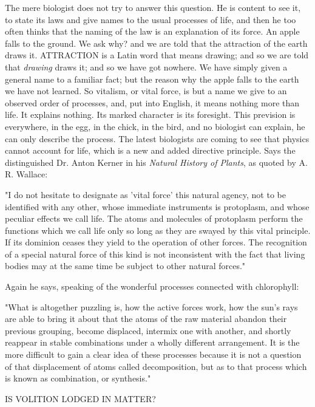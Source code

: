 The mere biologist does not try to answer this question. He is content to see it, to state its
laws and give names to the usual processes of life, and then he too often thinks that the
naming of the law is an explanation of its force. An apple falls to the ground. We ask why?
and we are told that the attraction of the earth draws it. ATTRACTION is a Latin word that
means drawing; and so we are told that \textit{drawing} draws it; and so we have got nowhere. We
have simply given a general name to a familiar fact; but the reason why the apple falls to the
earth we have not learned. So vitalism, or vital force, is but a name we give to an observed
order of processes, and, put into English, it means nothing more than life. It explains nothing.
Its marked character is its foresight. This prevision is everywhere, in the egg, in the chick, in
the bird, and no biologist can explain, he can only describe the process. The latest biologists
are coming to see that physics cannot account for life, which is a new and added directive
principle. Says the distinguished Dr. Anton Kerner in his \textit{Natural History of Plants}, as
quoted by A. R. Wallace:

"I do not hesitate to designate as 'vital force' this natural agency, not to be identified with any
other, whose immediate instruments is protoplasm, and whose peculiar effects we call life.
The atoms and molecules of protoplasm perform the functions which we call life only so
long as they are swayed by this vital principle. If its dominion ceases they yield to the
operation of other forces. The recognition of a special natural force of this kind is not
inconsistent with the fact that living bodies may at the same time be subject to other natural
forces."

Again he says, speaking of the wonderful processes connected with chlorophyll:

"What is altogether puzzling is, how the active forces work, how the sun's rays are able to
bring it about that the atoms of the raw material abandon their previous grouping, become
displaced, intermix one with another, and shortly reappear in stable combinations under a
wholly different arrangement. It is the more difficult to gain a clear idea of these processes
because it is not a question of that displacement of atoms called decomposition, but as to that
process which is known as combination, or synthesis."

IS VOLITION LODGED IN MATTER?

